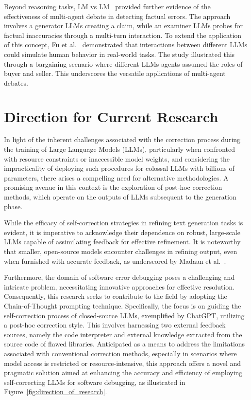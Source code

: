 \documentclass[a4paper,oneside]{book}
\begin{document}
Beyond reasoning tasks, LM vs LM~\cite{cohen2023lm} provided further evidence of the effectiveness of multi-agent debate in detecting factual errors. The approach involves a generator LLMs creating a claim, while an examiner LLMs probes for factual inaccuracies through a multi-turn interaction. To extend the application of this concept, Fu et al.~\cite{fu2023improving} demonstrated that interactions between different LLMs could simulate human behavior in real-world tasks. The study illustrated this through a bargaining scenario where different LLMs agents assumed the roles of buyer and seller. This underscores the versatile applications of multi-agent debates.

\section{Direction for Current Research}
In light of the inherent challenges associated with the correction process during the training of Large Language Models (LLMs), particularly when confronted with resource constraints or inaccessible model weights, and considering the impracticality of deploying such procedures for colossal LLMs with billions of parameters, there arises a compelling need for alternative methodologies. A promising avenue in this context is the exploration of post-hoc correction methods, which operate on the outputs of LLMs subsequent to the generation phase.

While the efficacy of self-correction strategies in refining text generation tasks is evident, it is imperative to acknowledge their dependence on robust, large-scale LLMs capable of assimilating feedback for effective refinement. It is noteworthy that smaller, open-source models encounter challenges in refining output, even when furnished with accurate feedback, as underscored by Madaan et al.~\cite{madaan2023selfrefine}.

Furthermore, the domain of software error debugging poses a challenging and intricate problem, necessitating innovative approaches for effective resolution. Consequently, this research seeks to contribute to the field by adopting the Chain-of-Thought prompting technique. Specifically, the focus is on guiding the self-correction process of closed-source LLMs, exemplified by ChatGPT, utilizing a post-hoc correction style. This involves harnessing two external feedback sources, namely the code interpreter and external knowledge extracted from the source code of flawed libraries. Anticipated as a means to address the limitations associated with conventional correction methods, especially in scenarios where model access is restricted or resource-intensive, this approach offers a novel and pragmatic solution aimed at enhancing the accuracy and efficiency of employing self-correcting LLMs for software debugging, as illustrated in Figure~\ref{fig:direction_of_research}.
\end{document}
